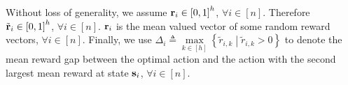 Without loss of generality, we assume ${\mathbf{r}}_i \in \left[ 0, 1 \right]^h$, $\forall i \in [n]$. Therefore ${\tilde{\mathbf{r}}}_i \in \left[ 0, 1 \right]^h$, $\forall i \in [n]$. ${\mathbf{r}}_i$ is the mean valued vector of some random reward vectors,  $\forall i \in [n]$. Finally, we use $\Delta_i \triangleq \max\limits_{k \in [h]}\left\{ \tilde{r}_{i,k} \middle| \tilde{r}_{i,k} > 0 \right\}$ to denote the mean reward gap between the optimal action and the action with the second largest mean reward at state ${\mathbf{s}}_i$, $\forall i \in [n]$.